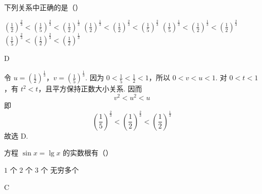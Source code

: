 \documentclass[UTF8,a4paper,oneside,11pt]{ctexbook}
\begin{document}
\begin{problem}
下列关系中正确的是（\quad）

\choices
    {\(\left( \frac{1}{2} \right)^{\frac{2}{3}}<\left( \frac{1}{5} \right)^{\frac{2}{3}}<\left( \frac{1}{2} \right)^{\frac{1}{3}}\)}
    {\(\left( \frac{1}{2} \right)^{\frac{1}{3}}<\left( \frac{1}{2} \right)^{\frac{2}{3}}<\left( \frac{1}{5} \right)^{\frac{2}{3}}\)}
    {\(\left( \frac{1}{5} \right)^{\frac{1}{3}}<\left( \frac{1}{2} \right)^{\frac{1}{3}}<\left( \frac{1}{2} \right)^{\frac{2}{3}}\)}
    {\(\left( \frac{1}{5} \right)^{\frac{2}{3}}<\left( \frac{1}{2} \right)^{\frac{2}{3}}<\left( \frac{1}{2} \right)^{\frac{1}{3}}\)}
\end{problem}

\begin{answer}
D
\end{answer}

\begin{solution}
令 \(u=\left(\frac12\right)^{\frac{1}{3}}\)，\(v=\left(\frac15\right)^{\frac{1}{3}}\). 因为 \(0<\frac15<\frac12<1\)，所以 \(0<v<u<1\). 对 \(0<t<1\)，有 \(t^2<t\)，且平方保持正数大小关系. 因而
\[
v^2<u^2<u
\]
即
\[
\left(\frac15\right)^{\frac{2}{3}}<\left(\frac12\right)^{\frac{2}{3}}<\left(\frac12\right)^{\frac{1}{3}}
\]
故选 D.
\end{solution}

\begin{problem}
方程 \(\sin x=\lg x\) 的实数根有（\quad）

\choices
    {\(1\) 个}
    {\(2\) 个}
    {\(3\) 个}
    {无穷多个}
\end{problem}

\begin{answer}
C
\end{answer}
\end{document}
